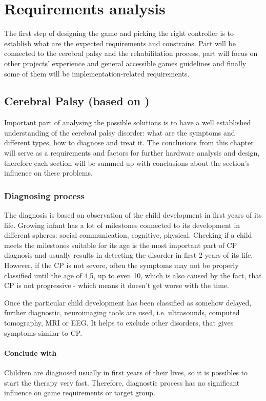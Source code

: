 \chapter{Requirements analysis}

The first step of designing the game and picking the right controller is to establish what are the expected requirements and constrains. Part will be connected to the cerebral palsy and the rehabilitation process, part will focus on other projects' experience and general accessible games guidelines and finally some of them will be implementation-related requirements. 

\section[Cerebral Palsy]{Cerebral Palsy (based on \cite{main_site, stats, WebMD, MedicineNet, CerebralPalsy})}
Important part of analysing the possible solutions is to have a well established understanding of the cerebral palsy disorder: what are the symptoms and different types, how to diagnose and treat it. The conclusions from this chapter will serve as a requirements and factors for further hardware analysis and design, therefore each section will be summed up with conclusions about the section's influence on these problems.

\subsection{Diagnosing process}
The diagnosis is based on observation of the child development in first years of its life. Growing infant has a lot of milestones connected to its development in different spheres: social communication, cognitive, physical. Checking if a child meets the milestones suitable for its age is the most important part of CP diagnosis and usually results in detecting the disorder in first 2 years of its life. However, if the CP is not severe, often the symptoms may not be properly classified until the age of 4,5, up to even 10, which is also caused by the fact, that CP is not progressive - which means it doesn't get worse with the time. 

Once the particular child development has been classified as somehow delayed, further diagnostic, neuroimaging tools are used, i.e. ultrasounds, computed tomography, MRI or EEG. It helps to exclude other disorders, that gives symptoms similar to CP.

\subsubsection*{Conclude with}
Children are diagnosed usually in first years of their lives, so it is possibles to start the therapy very fast. Therefore, diagnostic process has no significant influence on game requirements or target group.

